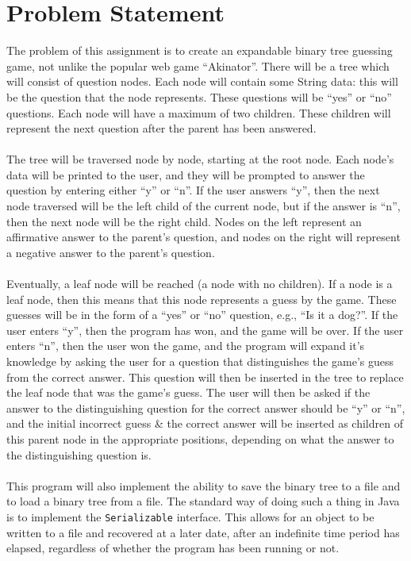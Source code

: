 \documentclass[a4paper]{article}
\begin{document}
\section{Problem Statement}
The problem of this assignment is to create an expandable binary tree guessing game, not unlike the popular web game ``Akinator''. 
There will be a tree which will consist of question nodes. 
Each node will contain some String data: this will be the question that the node represents. 
These questions will be ``yes'' or ``no'' questions.
Each node will have a maximum of two children. 
These children will represent the next question after the parent has been answered. 
\\\\
The tree will be traversed node by node, starting at the root node. 
Each node's data will be printed to the user, and they will be prompted to answer the question by entering either ``y'' or ``n''. 
If the user answers ``y'', then the next node traversed will be the left child of the current node, but if the answer is ``n'', then the next node will be the right child.
Nodes on the left represent an affirmative answer to the parent's question, and nodes on the right will represent a negative answer to the parent's question.
\\\\
Eventually, a leaf node will be reached (a node with no children). 
If a node is a leaf node, then this means that this node represents a guess by the game.
These guesses will be in the form of a ``yes'' or ``no'' question, e.g., ``Is it a dog?''. 
If the user enters ``y'', then the program has won, and the game will be over. 
If the user enters ``n'', then the user won the game, and the program will expand it's knowledge by asking the user for a question that distinguishes the game's guess from the correct answer.
This question will then be inserted in the tree to replace the leaf node that was the game's guess. 
The user will then be asked if the answer to the distinguishing question for the correct answer should be ``y'' or ``n'', and the initial incorrect guess \& the correct answer will be inserted as children 
of this parent node in the appropriate positions, depending on what the answer to the distinguishing question is.
\\\\
This program will also implement the ability to save the binary tree to a file and to load a binary tree from a file. 
The standard way of doing such a thing in Java is to implement the \verb|Serializable| interface. 
This allows for an object to be written to a file and recovered at a later date, after an indefinite time period has elapsed, regardless of whether the program has been running or not.
\end{document}
